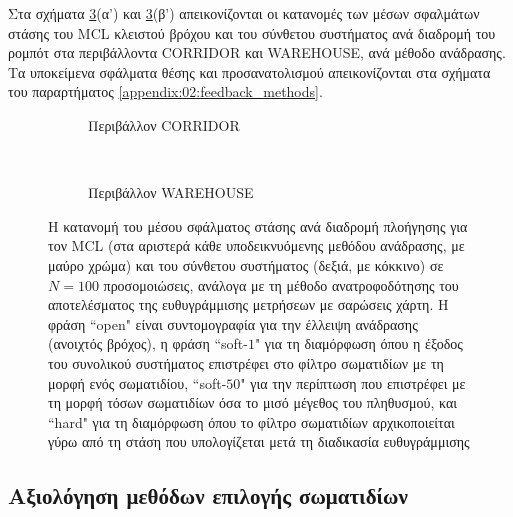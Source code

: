 Στα σχήματα \ref{fig:02_02_04:feedbacks}(α') και
\ref{fig:02_02_04:feedbacks}(β') απεικονίζονται οι κατανομές των μέσων
σφαλμάτων στάσης του MCL κλειστού βρόχου και του σύνθετου συστήματος ανά
διαδρομή του ρομπότ στα περιβάλλοντα CORRIDOR και WAREHOUSE, ανά μέθοδο
ανάδρασης. Τα υποκείμενα σφάλματα θέσης και προσανατολισμού απεικονίζονται στα
σχήματα του παραρτήματος \ref{appendix:02:feedback_methods}.

\begin{figure}
  \vspace{2cm}
  \begin{subfigure}{\linewidth}
  \hspace{-1.25cm}
    
    \vspace{0.3cm}
    \caption{Περιβάλλον CORRIDOR}
    \label{}
  \end{subfigure}\\
  \begin{subfigure}{\linewidth}\vspace{0.5cm}
    \hspace{-1.25cm}
    
    \vspace{0.3cm}
    \caption{Περιβάλλον WAREHOUSE}
    \label{}
  \end{subfigure}
\caption{\small Η κατανομή του μέσου σφάλματος στάσης ανά διαδρομή πλοήγησης
         για τον MCL (στα αριστερά κάθε υποδεικνυόμενης μεθόδου ανάδρασης, με
         μαύρο χρώμα) και του σύνθετου συστήματος (δεξιά, με κόκκινο) σε
         $N=100$ προσομοιώσεις, ανάλογα με τη μέθοδο ανατροφοδότησης του
         αποτελέσματος της ευθυγράμμισης μετρήσεων με σαρώσεις χάρτη. Η φράση
         ``open" είναι συντομογραφία για την έλλειψη ανάδρασης (ανοιχτός
         βρόχος), η φράση ``soft-$1$" για τη διαμόρφωση όπου η έξοδος του
         συνολικού συστήματος επιστρέφει στο φίλτρο σωματιδίων με τη μορφή ενός
         σωματιδίου, ``soft-$50$" για την περίπτωση που επιστρέφει με τη μορφή
         τόσων σωματιδίων όσα το μισό μέγεθος του πληθυσμού, και ``hard" για τη
         διαμόρφωση όπου το φίλτρο σωματιδίων αρχικοποιείται γύρω από τη στάση
         που υπολογίζεται μετά τη διαδικασία ευθυγράμμισης}
\label{fig:02_02_04:feedbacks}
\end{figure}


\subsection{Αξιολόγηση μεθόδων επιλογής σωματιδίων}
\label{subsection:02_02_04:03}

